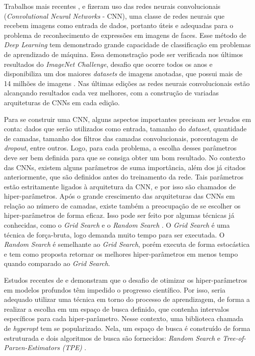 \documentclass[
12pt,				%
openright,			%
oneside,			%
a4paper,			%
english,			%
french,				%
spanish,			%
brazil				%
]{abntex2}
\begin{document}
Trabalhos mais recentes \cite{levi2015emotion}, \cite{mollahosseini2016going} e \cite{pramerdorfer2016facial} fizeram uso das redes neurais convolucionais (\textit{Convolutional Neural Networks} - CNN), uma classe de redes neurais que recebem imagens como entrada de dados, portanto úteis e adequadas para o problema de reconhecimento de expressões em imagens de faces. Esse método de \textit{Deep Learning} tem demonstrado grande capacidade de classificação em problemas de aprendizado de máquina. Essa demonstração pode ser verificada nos últimos resultados do \textit{ImageNet Challenge}, desafio que ocorre todos os anos e disponibiliza um dos maiores \textit{datasets} de imagens anotadas, que possui mais de 14 milhões de imagens \cite{deng2014scalable}. Nas últimas edições as redes neurais convolucionais estão alcançando resultados cada vez melhores, com a construção de variadas arquiteturas de CNNs em cada edição.

Para se construir uma CNN, alguns aspectos importantes precisam ser levados em conta: dados que serão utilizados como entrada, tamanho do \textit{dataset}, quantidade de camadas, tamanho dos filtros das camadas convolucionais, porcentagem de \textit{dropout}, entre outros. Logo, para cada problema, a escolha desses parâmetros deve ser bem definida para que se consiga obter um bom resultado. No contexto das CNNs, existem alguns parâmetros de suma importância, além dos já citados anteriormente, que são definidos antes do treinamento da rede. Tais parâmetros estão estritamente ligados à arquitetura da CNN, e por isso são chamados de hiper-parâmetros. Após o grande crescimento das arquiteturas das CNNs em relação ao número de camadas, existe também a preocupação de se escolher os hiper-parâmetros de forma eficaz. Isso pode ser feito por algumas técnicas já conhecidas, como o \textit{Grid Search} e o \textit{Random Search} \cite{bergstra2011algorithms}. O \textit{Grid Search} é uma técnica de força-bruta, logo demanda muito tempo para ser executada. O \textit{Random Search} é semelhante ao \textit{Grid Search}, porém executa de forma estocástica e tem como proposta retornar os melhores hiper-parâmetros em menos tempo quando comparado ao \textit{Grid Search}.

Estudos recentes de \cite{pinto2009high} e \cite{coates2011importance} demonstram que o desafio de otimizar os hiper-parâmetros em modelos profundos têm impedido o progresso científico. Por isso, seria adequado utilizar uma técnica em torno do processo de aprendizagem, de forma a realizar a escolha em um espaço de busca definido, que contenha intervalos específicos para cada hiper-parâmetro. Nesse contexto, uma biblioteca chamada de \textit{hyperopt} \cite{bergstra2013hyperopt} tem se popularizado. Nela, um espaço de busca é construído de forma estruturada e dois algoritmos de busca são fornecidos: \textit{Random Search} e \textit{Tree-of-Parzen-Estimators (TPE)} \cite{bergstra2011algorithms}.
\end{document}
